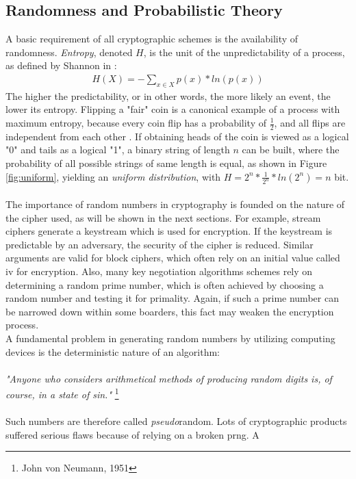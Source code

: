 \subsection{Randomness and Probabilistic Theory}
A basic requirement of all cryptographic schemes is the availability of randomness. \textit{Entropy}, denoted $H$, is the unit of the unpredictability of a process, as
 defined by Shannon in \cite{6773024}:
 \begin{align}
 H(X) = - \sum_{x \in X}^{} p(x) * ln(p(x))
\end{align}
The higher the predictability, or in other words, the more likely an event, the lower its entropy. Flipping a "fair" coin is a canonical 
example of a process with maximum entropy, because every coin flip has a probability of $\frac{1}{2}$, and all flips are independent from each other \cite{1621063}.
If obtaining heads of the coin is viewed as a logical "0" and tails as a logical "1", a binary string of length $n$ can be built, where the probability of all possible
strings of same length is equal, as shown in Figure \ref{fig:uniform}, yielding an \textit{uniform distribution}, with
$H = 2^n*\frac{1}{2^n}*ln(2^n) = n$ bit. 
\\
\\
The importance of random numbers in cryptography is founded on the nature of the cipher used, as will be shown in the next sections. For example,
stream ciphers generate a keystream which is used
for encryption. If the keystream is predictable by an adversary, the security of the cipher is reduced. Similar arguments are valid for block ciphers, which often
rely on an initial value called \gls{iv} for encryption. Also, many key negotiation algorithms schemes rely on determining a random prime number, which is often 
achieved by choosing a random number and testing it for primality. Again, if such a prime number can be narrowed down within some boarders, this fact may
weaken the encryption process.
\\
A fundamental problem in generating random numbers by utilizing computing devices is the deterministic nature of an algorithm:
\\
\\
\textit{"Anyone who considers arithmetical methods of producing random digits is, of course, in a state of sin."} \footnote{John von Neumann, 1951}
\\
\\
Such numbers are therefore called \textit{pseudo}random. Lots of cryptographic products suffered serious flaws because of relying on a broken \gls{prng}. A 
